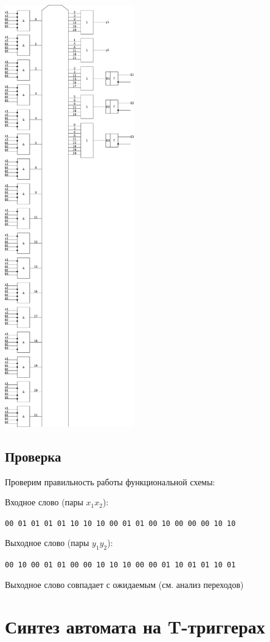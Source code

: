 \documentclass[listings]{labreport}
\begin{document}
\newpage
\includegraphics[width=0.42\textwidth]{sdffcircuit.pdf}

\subsection*{Проверка}

Проверим правильность работы функциональной схемы:

Входное слово (пары $x_1x_2$):

\verb|00 01 01 01 01 10 10 10 00 01 01 00 10 00 00 00 10 10|

Выходное слово (пары $y_1y_2$):

\verb|00 10 00 01 01 00 00 10 10 10 00 00 01 10 01 01 10 01|

Выходное слово совпадает с ожидаемым (см. анализ переходов)

\section*{Синтез автомата на T-триггерах}
\end{document}
